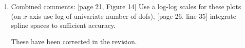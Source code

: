 \documentclass[10pt]{article}
\newcommand{\note}[1]{{\color{violet}#1}}
\begin{document}
\begin{enumerate}
\begin{enumerate}
\item Combined comments: [page 21, Figure 14]           Use a log-log scales for these plots (on $x$-axis use log of univariate number of dofs), [page 26, line 35]     integrate spline spaces to sufficient accuracy.  

\note{These have been corrected in the revision.}


\end{enumerate}
\end{enumerate}




\end{document}
